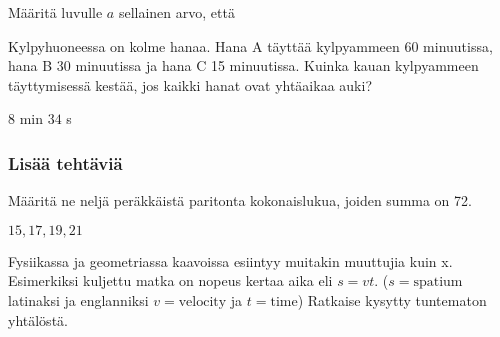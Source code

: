 \begin{tehtavasivu}
\begin{tehtava}
Määritä luvulle $a$ sellainen arvo, että
  \begin{alakohdat}
  \end{alakohdat}
\begin{vastaus}
   \begin{alakohdat}
      \end{alakohdat}
\end{vastaus}
\end{tehtava}


\begin{tehtava}
Kylpyhuoneessa on kolme hanaa. Hana A täyttää kylpyammeen 60 minuutissa, hana B 30 minuutissa ja hana C 15 minuutissa. Kuinka kauan kylpyammeen täyttymisessä kestää, jos kaikki hanat ovat yhtäaikaa auki?
\begin{vastaus}
$8$ min $34$ s
\end{vastaus}
\end{tehtava}

\subsubsection*{Lisää tehtäviä}

\begin{tehtava}
Määritä ne neljä peräkkäistä paritonta kokonaislukua, joiden summa on 72.
	\begin{vastaus}
	 $15, 17, 19, 21$
	\end{vastaus}
\end{tehtava}


\begin{tehtava}
Fysiikassa ja geometriassa kaavoissa esiintyy muitakin muuttujia kuin x. Esimerkiksi kuljettu matka on nopeus kertaa aika eli $s=vt$. ($s= \text{spatium}$ latinaksi ja englanniksi $v= \text{velocity}$ ja $t= \text{time}$) Ratkaise kysytty tuntematon yhtälöstä.

\begin{alakohdat}
% 
\end{alakohdat}
\begin{vastaus}
\begin{alakohdat}
\end{alakohdat}
\end{vastaus}
\end{tehtava}


\end{tehtavasivu}
